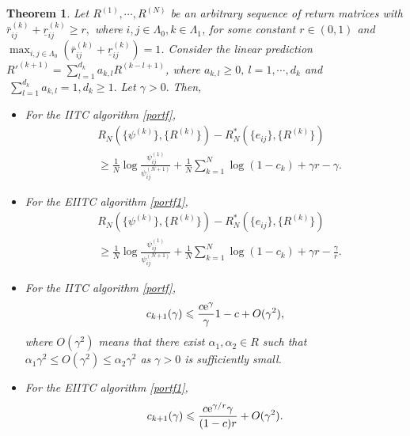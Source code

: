 \documentclass[11pt]{article}
\newtheorem{theorem}{Theorem}[section]
\numberwithin{equation}{section}
\begin{document}
\begin{theorem}\label{R}
Let $R^{(1)}, \cdots, R^{(N)}$ be an arbitrary sequence of return matrices with $\bar r_{ij}^{(k)}+\underline r_{ij}^{(k)}\ge r,$ where $ i,j\in\Lambda_0,k\in\Lambda_1$,  for some constant $r\in(0,1)$  and $ 
\max_{i,j\in\Lambda_0}(\bar r_{ij}^{(k)}+\underline r_{ij}^{(k)})=1 $. Consider the linear prediction ${R'}^{(k+1)}=\sum_{l=1}^{d_k}a_{k,l}R^{(k-l+1)}$, where $a_{k,l}\ge0,~ l=1,\cdots, d_k$ and                   
 $~\sum_{l=1}^{d_k}a_{k,l}=1, d_k\ge1.$  Let $\gamma>0.$ Then,  
 
 \begin{itemize}
\item For the IITC algorithm \eqref{portf},
\begin{equation} \label{ren9}
\begin{split}
&R_N(\{\psi^{(k)}\},\{R^{(k)}\})-R_N^*(\{e_{ij}\},\{R^{(k)}\})\\
&\ge\frac{1}{N}\log\frac{\psi^{(1)}_{ij}}{\psi^{(N+1)}_{ij}}+\frac{1}{N}\sum_{k=1}^{N}\log (1-c_k)+\gamma r-\gamma
.
\end{split}
\end{equation}
\item For  the EIITC algorithm \eqref{portf1},
\begin{equation} \label{ren10}
\begin{split}
&R_N(\{\psi^{(k)}\},\{R^{(k)}\})-R_N^*(\{e_{ij}\},\{R^{(k)}\})\\
&\ge\frac{1}{N}\log\frac{\psi^{(1)}_{ij}}{\psi^{(N+1)}_{ij}}+\frac{1}{N}\sum_{k=1}^{N}\log (1-c_k)+\gamma r-\frac{\gamma}{r}
.
\end{split}
\end{equation}
\item For the IITC algorithm \eqref{portf},
\begin{equation}\label{PP}
c_{k+1}(\gamma)\leqslant \frac{c\text{\rm{e}}^\gamma}\gamma{1-c}+O(\gamma^2),
\end{equation}
where $O(\gamma^2)$ means that there exist  $\alpha_1,\alpha_2\in R$  such that $\alpha_1\gamma^2\le O(\gamma^2)\le \alpha_2\gamma^2$ as $\gamma>0$ is sufficiently small.
\item For  the EIITC algorithm \eqref{portf1}, 
\begin{equation}\label{PPP}
c_{k+1}(\gamma)\leqslant \frac{c\text{\rm{e}}^{\gamma/r}\gamma}{(1-c)r}+O(\gamma^2).
\end{equation}
\end{itemize}


\end{theorem}
 
\end{document}

